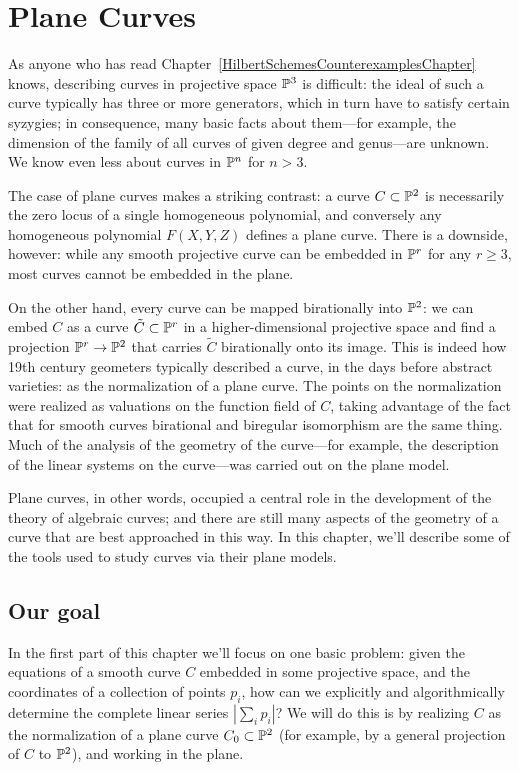 

\chapter{Plane Curves}
\label{PlaneCurvesChapter}


As anyone who has read  Chapter~\ref{HilbertSchemesCounterexamplesChapter} knows, describing curves in projective space ${\mathbb P}^3$  is difficult: the ideal of such a curve typically has three or more generators, which in turn have to satisfy certain syzygies; in consequence, many basic facts about them---for example, the dimension of the family of all curves of given degree and genus---are unknown. We know even less about curves in ${\mathbb P}^n$ for $n > 3$.

The case of plane curves makes a striking contrast: a curve $C \subset {\mathbb P}^2$ is necessarily the zero locus of a single homogeneous polynomial, and conversely any homogeneous polynomial $F(X,Y,Z)$ defines a plane curve. There is a downside, however: while any smooth projective curve can be embedded in ${\mathbb P}^r$ for any $r \geq 3$, most curves cannot be embedded in the plane. 

On the other hand, every curve can be mapped birationally into ${\mathbb P}^2$: we can embed $C$ as a curve $\tilde C \subset {\mathbb P}^r$ in a higher-dimensional projective space and find a projection ${\mathbb P}^r \to {\mathbb P}^2$ that carries $\tilde C$ birationally onto its image. This is indeed how 19th century geometers typically described a curve, in the days before abstract varieties: as the normalization of a plane curve. The points on the normalization were realized as valuations on the function field of $C$,  taking advantage of the fact that for smooth curves birational and biregular isomorphism are the same thing. Much of the analysis of the geometry of the curve---for example, the description of the linear systems on the curve---was carried out on the plane model.

Plane curves, in other words, occupied a central role in the development of the theory of algebraic curves; and there are still many aspects of the geometry of a curve that are best approached in this way. In this chapter, we'll describe some of the tools used to study  curves via their plane models.

\section{Our goal}

In the first part of this chapter we'll focus  on one basic problem:
given the equations of a smooth curve $C$ embedded in some projective space, and the coordinates of a collection of points $p_i$, how can we explicitly and algorithmically determine the complete linear series 
$|\sum_i p_i|$? We will do this is by realizing  $C$ as the normalization of a plane curve $C_0 \subset {\mathbb P}^2$ (for example, by a general projection of $C$ to ${\mathbb P}^2$), and working in the plane. 

